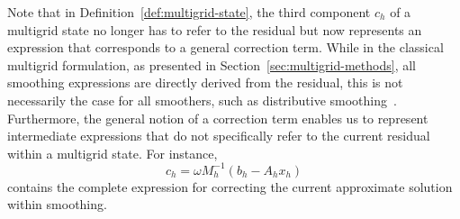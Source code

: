 Note that in Definition~\ref{def:multigrid-state}, the third component $c_{h}$ of a multigrid state no longer has to refer to the residual but now represents an expression that corresponds to a general correction term.
While in the classical multigrid formulation, as presented in Section~\ref{sec:multigrid-methods}, all smoothing expressions are directly derived from the residual, this is not necessarily the case for all smoothers, such as distributive smoothing~\cite{trottenberg2000multigrid}.
Furthermore, the general notion of a correction term enables us to represent intermediate expressions that do not specifically refer to the current residual within a multigrid state.
For instance,
\begin{equation*}
    c_h = \omega M_h^{-1} \left( b_h - A_h x_h \right)
\end{equation*}
contains the complete expression for correcting the current approximate solution within smoothing.
